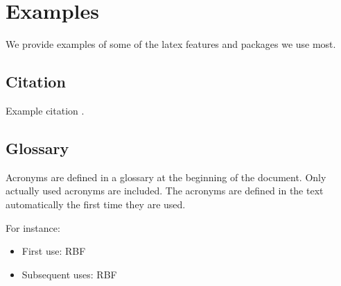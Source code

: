 \section{Examples}
We provide examples of some of the latex features and packages we use most.

\subsection{Citation}
Example citation \cite{Gehrels:2016}.

\subsection{Glossary}
Acronyms are defined in a glossary at the beginning of the document. Only
actually used acronyms are included. The acronyms are defined in the text
automatically the first time they are used.

For instance:
\begin{itemize}
\item First use: \gls{RBF}
\item Subsequent uses: \gls{RBF}
\end{itemize}

